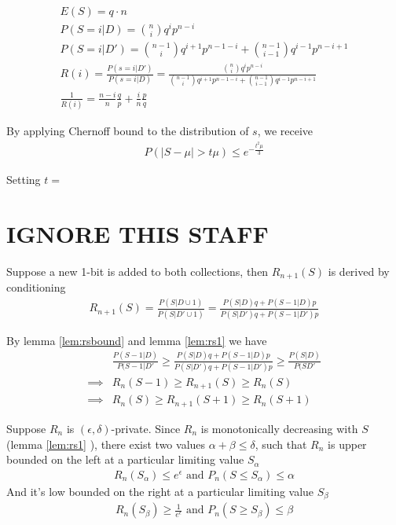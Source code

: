 \documentclass[11pt]{article}
\begin{document}
\begin{align}
E(S) = q \cdot n \\
P(S=i | D ) = \binom{n}{i}q^ip^{n-i} \\
P(S=i | D' ) = \binom{n-1}{i}q^{i+1}p^{n-1-i} +   \binom{n-1}{i-1}q^{i-1}p^{n-i+1}  \\
R(i)  = \frac{P(s=i | D')}{P(s=i | D)} = \frac{ \binom{n}{i}q^ip^{n-i} }{  \binom{n-1}{i}q^{i+1}p^{n-1-i} +   \binom{n-1}{i-1}q^{i-1}p^{n-i+1} } \\
\frac{1}{R(i)} =  \frac{n-i}{n}\frac{q}{p} + \frac{i}{n} \frac{p}{q}
\end{align}

By applying Chernoff bound to the distribution of $s$, we receive
 \begin{align}
P(|S - \mu| > t\mu) \le e^{- \frac{t^2\mu}{3}}
\end{align}

Setting $t=$
 
 \newpage
 \section{IGNORE THIS STAFF}
 
 Suppose a new 1-bit is added to both collections, then $R_{n+1}(S)$ is derived by conditioning
 \begin{align*}
R_{n+1}(S) = \frac{ P(S|D \cup 1) }{ P(S|D' \cup 1) } = \frac { P(S|D)q + P(S-1|D)p } { P(S|D')q + P(S-1|D')p}
\end{align*}
 
By lemma \eqref{lem:rsbound} and lemma  \eqref{lem:rs1} we have
\begin{align}
 & \frac{P(S-1|D)}{P(S-1|D'} \ge  \frac { P(S|D)q + P(S-1|D)p } { P(S|D')q + P(S-1|D')p} \ge \frac{P(S|D)}{P(SD'} \\
\implies & R_n(S-1) \ge R_{n+1}(S) \ge R_n(S) \\
\implies & R_n(S) \ge R_{n+1}(S+1) \ge R_n(S+1) \label{lem:rsb2}
\end{align}
 
Suppose $R_n$ is $(\epsilon, \delta)$-private. Since $R_n$ is monotonically decreasing with $S$ (lemma  \eqref{lem:rs1} ), there exist two values $\alpha + \beta \le \delta$, such that $R_n$ is upper bounded on the left at a particular limiting value $S_\alpha$ 
 \begin{align}  \label{lem:rsb3}
 R_n(S_\alpha) \le e^\epsilon \text{ and } P_n(S \le S_\alpha) \le \alpha 
\end{align}
And it's low bounded on the right at a particular limiting value $S_\beta$
 \begin{align}  \label{lem:rsb4}
 R_n(S_\beta) \ge \frac{1}{e^\epsilon} \text{ and } P_n(S \ge S_\beta) \le \beta
\end{align}
 
\end{document}
